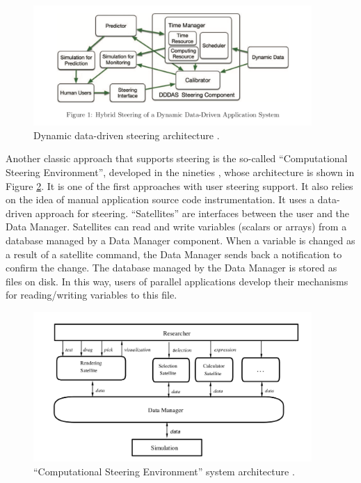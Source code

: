 \begin{figure}[H]
    \centering
    \includegraphics[width=400px,trim={0 1.3cm 0 0},clip,keepaspectratio]{img/media/image15.png}
    \caption{Dynamic data-driven steering architecture \cite{Han2016Hybrid}.}
    \label{fig:fig3_5}
\end{figure}

Another classic approach that supports steering is the so-called
``Computational Steering Environment'', developed in the nineties
\cite{Liere1996Computational,VanLiere1997Computational,Wijk1994Environment},
whose architecture is shown in Figure \ref{fig:fig3_6}. It is one of the first approaches
with user steering support. It also relies on the idea of
manual application source code instrumentation. It uses a data-driven
approach for steering. ``Satellites'' are interfaces between the user
and the Data Manager. Satellites can read and write variables (scalars
or arrays) from a database managed by a Data Manager component. When a
variable is changed as a result of a satellite command, the Data Manager
sends back a notification to confirm the change. The database managed by
the Data Manager is stored as files on disk. In this way, users of
parallel applications develop their mechanisms for reading/writing
variables to this file.


\begin{figure}[H]
    \centering
    \includegraphics[width=400px,keepaspectratio]{img/media/image16.png}
    \caption{``Computational Steering Environment'' system architecture
\cite{Liere1996Computational,VanLiere1997Computational,Wijk1994Environment}.}
    \label{fig:fig3_6}
\end{figure}



